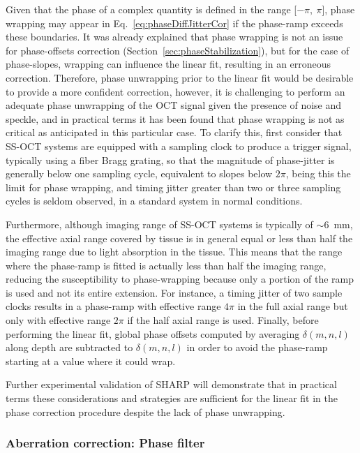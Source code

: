 Given that the phase of a complex quantity is defined in the range [$-\pi,\ \pi$], phase wrapping may appear in Eq.~\ref{eq:phaseDiffJitterCor} if the phase-ramp exceeds these boundaries. It was already explained that phase wrapping is not an issue for phase-offsets correction (Section~\ref{sec:phaseStabilization}), but for the case of phase-slopes, wrapping can influence the linear fit, resulting in an erroneous correction. Therefore, phase unwrapping prior to the linear fit would be desirable to provide a more confident correction, however, it is challenging to perform an adequate phase unwrapping of the OCT signal given the presence of noise and speckle, and in practical terms it has been found that phase wrapping is not as critical as anticipated in this particular case. To clarify this, first consider that SS-OCT systems are equipped with a sampling clock to produce a trigger signal, typically using a fiber Bragg grating, so that the magnitude of phase-jitter is generally below one sampling cycle, equivalent to slopes below $2\pi$, being this the limit for phase wrapping, and timing jitter greater than two or three sampling cycles is seldom observed, in a standard system in normal conditions.

Furthermore, although imaging range of SS-OCT systems is typically of $\sim$6~mm, the effective axial range covered by tissue is in general equal or less than half the imaging range due to light absorption in the tissue. This means that the range where the phase-ramp is fitted is actually less than half the imaging range, reducing the susceptibility to phase-wrapping because only a portion of the ramp is used and not its entire extension. For instance, a timing jitter of two sample clocks results in a phase-ramp with effective range $4\pi$ in the full axial range but only with effective range $2\pi$ if the half axial range is used. Finally, before performing the linear fit, global phase offsets computed by averaging $\delta(m,n,l)$ along depth are subtracted to $\delta(m,n,l)$ in order to avoid the phase-ramp starting at a value where it could wrap.

Further experimental validation of SHARP will demonstrate that in practical terms these considerations and strategies are sufficient for the linear fit in the phase correction procedure despite the lack of phase unwrapping.

\subsubsection{Aberration correction: Phase filter}


